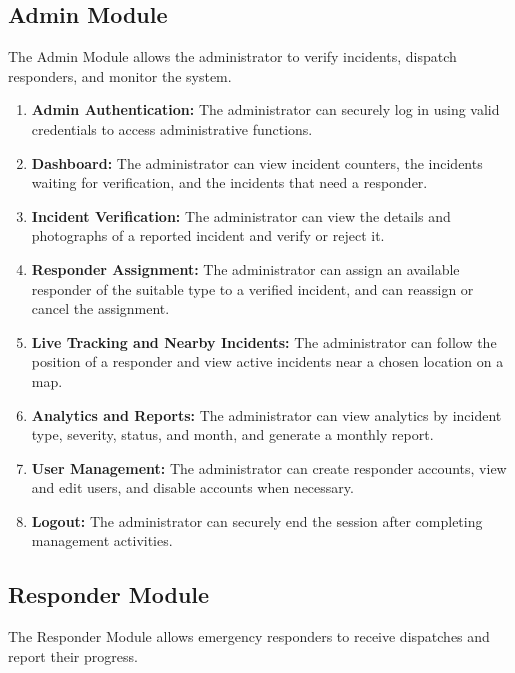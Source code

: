 \documentclass[a4paper,12pt]{report}
\begin{document}
	\subsection{Admin Module}
	The Admin Module allows the administrator to verify incidents, dispatch responders, and monitor the system.
	
	\begin{enumerate}
		\item \textbf{Admin Authentication:} The administrator can securely log in using valid credentials to access administrative functions.
		
		\item \textbf{Dashboard:} The administrator can view incident counters, the incidents waiting for verification, and the incidents that need a responder.
		
		\item \textbf{Incident Verification:} The administrator can view the details and photographs of a reported incident and verify or reject it.
		
		\item \textbf{Responder Assignment:} The administrator can assign an available responder of the suitable type to a verified incident, and can reassign or cancel the assignment.
		
		\item \textbf{Live Tracking and Nearby Incidents:} The administrator can follow the position of a responder and view active incidents near a chosen location on a map.
		
		\item \textbf{Analytics and Reports:} The administrator can view analytics by incident type, severity, status, and month, and generate a monthly report.
		
		\item \textbf{User Management:} The administrator can create responder accounts, view and edit users, and disable accounts when necessary.
		
		\item \textbf{Logout:} The administrator can securely end the session after completing management activities.
	\end{enumerate}
	
	\subsection{Responder Module}
	The Responder Module allows emergency responders to receive dispatches and report their progress.
	
\end{document}
